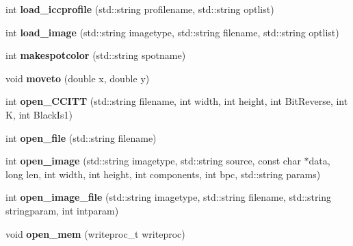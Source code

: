 \begin{DoxyCompactItemize}
\item 
\hypertarget{classPDFlib_a0e9a54de242086ebd19748c3ecf3a47d}{int {\bfseries load\-\_\-iccprofile} (std\-::string profilename, std\-::string optlist)}\label{classPDFlib_a0e9a54de242086ebd19748c3ecf3a47d}

\item 
\hypertarget{classPDFlib_a6d69dea52622a7af8d6231e1ada76139}{int {\bfseries load\-\_\-image} (std\-::string imagetype, std\-::string filename, std\-::string optlist)}\label{classPDFlib_a6d69dea52622a7af8d6231e1ada76139}

\item 
\hypertarget{classPDFlib_ad593e18f817501af814242eebe39902b}{int {\bfseries makespotcolor} (std\-::string spotname)}\label{classPDFlib_ad593e18f817501af814242eebe39902b}

\item 
\hypertarget{classPDFlib_a4b04a1be188fcb180132f2aa4f0a357c}{void {\bfseries moveto} (double x, double y)}\label{classPDFlib_a4b04a1be188fcb180132f2aa4f0a357c}

\item 
\hypertarget{classPDFlib_ad680c8f235044b05c2299f35facbe1a4}{int {\bfseries open\-\_\-\-C\-C\-I\-T\-T} (std\-::string filename, int width, int height, int \-Bit\-Reverse, int \-K, int \-Black\-Is1)}\label{classPDFlib_ad680c8f235044b05c2299f35facbe1a4}

\item 
\hypertarget{classPDFlib_ad3b48373b17c17a9e8b491ef1da40bdf}{int {\bfseries open\-\_\-file} (std\-::string filename)}\label{classPDFlib_ad3b48373b17c17a9e8b491ef1da40bdf}

\item 
\hypertarget{classPDFlib_aaf45ace35fe6f1b149f4f8d729dbd612}{int {\bfseries open\-\_\-image} (std\-::string imagetype, std\-::string source, const char $\ast$data, long len, int width, int height, int components, int bpc, std\-::string params)}\label{classPDFlib_aaf45ace35fe6f1b149f4f8d729dbd612}

\item 
\hypertarget{classPDFlib_a11741eafa900b4490097cb913709b984}{int {\bfseries open\-\_\-image\-\_\-file} (std\-::string imagetype, std\-::string filename, std\-::string stringparam, int intparam)}\label{classPDFlib_a11741eafa900b4490097cb913709b984}

\item 
\hypertarget{classPDFlib_a2ec7cc181d64f7baa8d08e74f2824ab8}{void {\bfseries open\-\_\-mem} (writeproc\-\_\-t writeproc)}\label{classPDFlib_a2ec7cc181d64f7baa8d08e74f2824ab8}


\end{DoxyCompactItemize}

